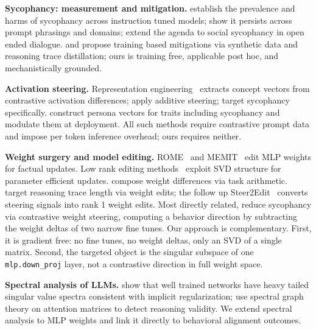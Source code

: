 \documentclass{article}
\begin{document}
\textbf{Sycophancy: measurement and mitigation.}
\citet{sharmaTowardsUnderstandingSycophancy2023} establish the
prevalence and harms of sycophancy across instruction tuned models;
\citet{perezSycophancySubtleManipulator2022} show it persists across
prompt phrasings and domains;
\citet{chengELEPHANTSocialSycophancy2025} extend the agenda to social
sycophancy in open ended dialogue.
\citet{weiSimpleSyntheticData2023} and
\citet{mukherjeeORCA2Reasoning2023} propose training based mitigations
via synthetic data and reasoning trace distillation; ours is training
free, applicable post hoc, and mechanistically grounded.

\textbf{Activation steering.}
Representation engineering~\citep{zou2023representation} extracts
concept vectors from contrastive activation differences;
\citet{turner2023activation} apply additive steering;
\citet{panicksserySteeringLlama2023} target sycophancy specifically.
\citet{chenPersonaVectors2025} construct persona vectors for traits
including sycophancy and modulate them at deployment. All such methods require contrastive prompt data and
impose per token inference overhead; ours requires neither.

\textbf{Weight surgery and model editing.}
ROME~\citep{mengLocatingEditingFactual2022} and
MEMIT~\citep{meng2023massEditing} edit MLP weights for factual
updates. Low rank editing methods~\citep{huLoRALowRankAdaptation2021}
exploit SVD structure for parameter efficient updates.
\citet{ilharco2023editing} compose weight differences via task
arithmetic. \citet{sunThinkEdit2025} target reasoning trace length
via weight edits; the follow up
Steer2Edit~\citep{sunSteer2Edit2026} converts steering signals into
rank 1 weight edits.
Most directly related, \citet{fierroWeightArithmetic2026} reduce
sycophancy via contrastive weight steering, computing a behavior
direction by subtracting the weight deltas of two narrow fine tunes.
Our approach is complementary. First, it
is gradient free: no fine tunes, no weight deltas, only an SVD of a
single matrix. Second, the targeted object is the singular subspace
of one \texttt{mlp.down\_proj} layer, not a contrastive direction in
full weight space.

\textbf{Spectral analysis of LLMs.}
\citet{martinImplicitSelfregularizationDeep2021} show that well
trained networks have heavy tailed singular value spectra consistent
with implicit regularization;
\citet{noelGeometryReasonSpectral2025} use spectral graph theory on
attention matrices to detect reasoning validity. We extend spectral
analysis to MLP weights and link it directly to behavioral alignment
outcomes.
\end{document}
